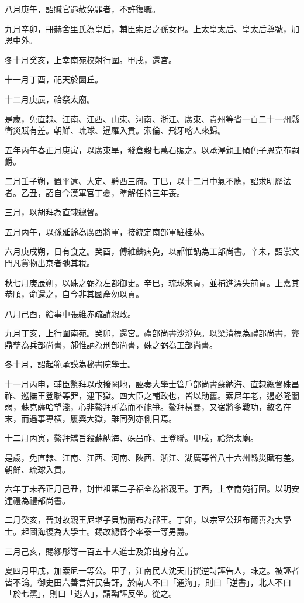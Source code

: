 \begin{pinyinscope}
八月庚午，詔贓官遇赦免罪者，不許復職。

九月辛卯，冊赫舍里氏為皇后，輔臣索尼之孫女也。上太皇太后、皇太后尊號，加恩中外。

冬十月癸亥，上幸南苑校射行圍。甲戌，還宮。

十一月丁酉，祀天於圜丘。

十二月庚辰，祫祭太廟。

是歲，免直隸、江南、江西、山東、河南、浙江、廣東、貴州等省一百二十一州縣衛災賦有差。朝鮮、琉球、暹羅入貢。索倫、飛牙喀人來歸。

五年丙午春正月庚寅，以廣東旱，發倉穀七萬石賑之。以承澤親王碩色子恩克布嗣爵。

二月壬子朔，置平遠、大定、黔西三府。丁巳，以十二月中氣不應，詔求明歷法者。乙丑，詔自今漢軍官丁憂，準解任持三年喪。

三月，以胡拜為直隸總督。

五月丙午，以孫延齡為廣西將軍，接統定南部軍駐桂林。

六月庚戌朔，日有食之。癸酉，傅維麟病免，以郝惟訥為工部尚書。辛未，詔崇文門凡貨物出京者弛其稅。

秋七月庚辰朔，以硃之弼為左都御史。辛巳，琉球來貢，並補進漂失前貢。上嘉其恭順，命還之，自今非其國產勿以貢。

八月己酉，給事中張維赤疏請親政。

九月丁亥，上行圍南苑。癸卯，還宮。禮部尚書沙澄免。以梁清標為禮部尚書，龔鼎孳為兵部尚書，郝惟訥為刑部尚書，硃之弼為工部尚書。

冬十月，詔起範承謨為秘書院學士。

十一月丙申，輔臣鰲拜以改撥圈地，誣奏大學士管戶部尚書蘇納海、直隸總督硃昌祚、巡撫王登聯等罪，逮下獄。四大臣之輔政也，皆以勛舊。索尼年老，遏必隆闇弱，蘇克薩哈望淺，心非鰲拜所為而不能爭。鰲拜橫暴，又宿將多戰功，敘名在末，而遇事專橫，屢興大獄，雖同列亦側目焉。

十二月丙寅，鰲拜矯旨殺蘇納海、硃昌祚、王登聯。甲戌，祫祭太廟。

是歲，免直隸、江南、江西、河南、陜西、浙江、湖廣等省八十六州縣災賦有差。朝鮮、琉球入貢。

六年丁未春正月己丑，封世祖第二子福全為裕親王。丁酉，上幸南苑行圍。以明安達禮為禮部尚書。

二月癸亥，晉封故親王尼堪子貝勒蘭布為郡王。丁卯，以宗室公班布爾善為大學士。起圖海復為大學士。錫故總督李率泰一等男爵。

三月己亥，賜繆彤等一百五十人進士及第出身有差。

夏四月甲戌，加索尼一等公。甲子，江南民人沈天甫撰逆詩誣告人，誅之。被誣者皆不論。御史田六善言奸民告訐，於南人不曰「通海」，則曰「逆書」，北人不曰「於七黨」，則曰「逃人」，請鞫誣反坐。從之。


\end{pinyinscope}

